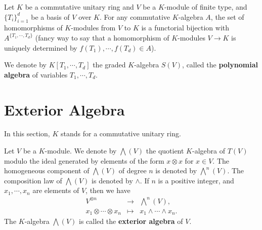 \begin{exampleenv}
    Let $K$ be a commutative unitary ring and $V$ be a $K$-module of finite type, and $\{T_i\}_{i=1}^{d}$ be a basis of $V$ over $K$.
    For any commutative $K$-algebra $A$, the set of homomorphisms of $K$-modules from $V$ to $K$ is a functorial bijection with $A^{\{T_1,\cdots,T_d\}}$ (fancy way to say that a homomorphism of $K$-modules $V \rightarrow K$ is uniquely determined by $f(T_1), \cdots, f(T_d) \in A$).
    
    \quad We denote by $K[T_1,\cdots, T_d]$ the graded $K$-algebra $S(V)$, called the \textbf{polynomial algebra} of variables $T_1, \cdots, T_d$. 
\end{exampleenv}
\newpage

\section{Exterior Algebra}
In this section, $K$ stands for a commutative unitary ring.

\begin{definitionenv}
    Let $V$ be a $K$-module.
    We denote by $\bigwedge (V)$ the quotient $K$-algebra of $T(V)$ modulo the ideal generated by elements of the form $x\otimes x$ for $x \in V$.
    The homogeneous component of $\bigwedge (V)$ of degree $n$ is denoted by $\bigwedge^n (V)$.
    The composition law of $\bigwedge (V)$ is denoted by $\wedge$.
    If $n$ is a positive integer, and $x_1, \cdots, x_n$ are elements of $V$, then we have
    $$\begin{array}{rcl}
        V^{\otimes n} & \longrightarrow & \bigwedge^n (V),\\
        x_1 \otimes \cdots \otimes x_n & \longmapsto & x_1 \wedge \cdots \wedge x_n.
    \end{array}$$
    The $K$-algebra $\bigwedge (V)$ is called the \textbf{exterior algebra} of $V$.
\end{definitionenv}

